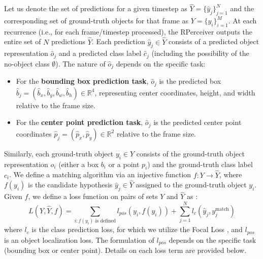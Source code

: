 Let us denote the set of predictions for a given timestep as $ \hat{Y} = \{\hat{y}_j\}_{j=1}^N $ and the corresponding set of ground-truth objects for that frame as $ Y = \{y_i\}_{i=1}^M $. At each recurrence (i.e., for each frame/timestep processed), the RPerceiver outputs the entire set of $N$ predictions $\hat{Y}$. Each prediction $\hat{y}_j \in \hat{Y}$ consists of a predicted object representation $\hat{o}_j$ and a predicted class label $\hat{c}_j$ (including the possibility of the no-object class $\emptyset$). The nature of $\hat{o}_j$ depends on the specific task:
\begin{itemize}
    \item For the \textbf{bounding box prediction task}, $\hat{o}_j$ is the predicted box $\hat{b}_j = (\hat{b}_x, \hat{b}_y, \hat{b}_w, \hat{b}_h) \in \mathbb{R}^4$, representing center coordinates, height, and width relative to the frame size.
    \item For the \textbf{center point prediction task}, $\hat{o}_j$ is the predicted center point coordinates $\hat{p}_j = (\hat{p}_x, \hat{p}_y) \in \mathbb{R}^2$ relative to the frame size.
\end{itemize}
Similarly, each ground-truth object $y_i \in Y$ consists of the ground-truth object representation $o_i$ (either a box $b_i$ or a point $p_i$) and the ground-truth class label $c_i$.
We define a matching algorithm via an injective function $f: Y \rightarrow \hat{Y}$, where $f(y_i)$ is the candidate hypothesis $\hat{y}_j \in \hat{Y}$ assigned to the ground-truth object $y_i$. Given $f$, we define a loss function on pairs of sets $Y$ and $\hat{Y}$ as \cite{}:
\begin{equation} \label{eq:set_loss}
L(Y, \hat{Y}, f ) = \sum_{i: f(y_i) \text{ is defined}} l_{pos}(y_i, f(y_i)) +  \sum_{j=1}^{N} l_c (\hat{y}_j, y_j^{\text{match}})
\end{equation}
where $l_c$ is the class prediction loss, for which we utilize the Focal Loss \cite{}, and $l_{pos}$ is an object localization loss. The formulation of $l_{pos}$ depends on the specific task (bounding box or center point). Details on each loss term are provided below.

